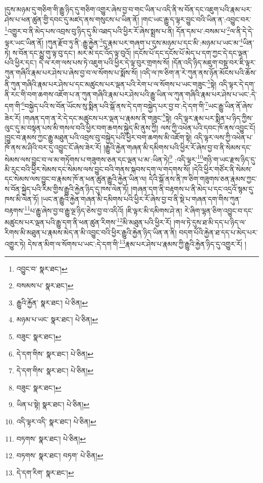 །དུས་མཉམ་དུ་གཅིག་གི་རྒྱུ་ཉིད་དུ་གཅིག་འགྱུར་ཞེས་བྱ་བ་གང་ཡིན་པ་འདི་ནི་ས་བོན་དང་འཇུག་པའི་རྣམ་པར་ཤེས་པ་ཕན་ཚུན་གྱི་དབང་དུ་མཛད་ནས་གསུངས་པ་ཡིན་ནོ། །གང་ཡང་རྒྱུ་ད་ལྟར་བྱུང་བའི་ཡིན་ན་:འབྱུང་བར་\footnote{འབྱུང་བ་  སྣར་ཐང་། }འགྱུར་བ་ནི་མེད་པས་འབྲས་བུ་ཉིད་དུ་མི་འཐད་པའི་ཕྱིར་རོ་ཞེས་སྨྲས་པ་ནི། དོན་དམ་པ་:བསམ་པ་\footnote{བསམས་པ་  སྣར་ཐང་། }ལ་ནི་དེ་དེ་ལྟར་ཡང་ཡིན་ནོ། །ཀུན་རྫོབ་ཏུ་ནི་:རྒྱུ་རྐྱེན་\footnote{རྒྱུའི་རྐྱོན་  སྣར་ཐང་།  པེ་ཅིན། }དུ་རྣམ་པར་གཞག་པ་དུས་མཉམ་པ་དང་མི་:མཉམ་པ་ཡང་མ་\footnote{མཉམ་པ་ཡང་  སྣར་ཐང་།  པེ་ཅིན། }ཡིན་ཏེ། ས་བོན་དང་མྱུ་གུ་ལྟ་བུ་དང་། མར་མེ་དང་འོད་ལྟ་བུའོ། །དངོས་པོ་དང་དངོས་པོ་མེད་པ་དག་ཀྱང་དེ་དང་ལྡན་པའི་ཕྱིར་དང་། དེ་ལ་རག་ལས་པས་ཏེ་འཇུག་པའི་ཕྱིར་དེ་ལྟ་བུར་གྲགས་སོ། །དོན་འདི་ཉིད་མཇུག་བསྡུ་བར་ཇི་ལྟར་ཀུན་གཞིའི་རྣམ་པར་ཤེས་པ་ཞེས་བྱ་བ་ལ་སོགས་པ་སྨོས་སོ། །འདི་ལ་ཁ་ཅིག་ན་རེ་ཀུན་ནས་ཉོན་མོངས་པའི་ཆོས་ནི་ཀུན་གཞིའི་རྣམ་པར་ཤེས་པ་དང་མཚུངས་པར་ལྡན་པའི་རེག་པ་ལ་སོགས་པ་ཡང་གཟུང་\footnote{བཟུང་  སྣར་ཐང་། }སྟེ། འདི་ལྟར་དེ་དག་ནི་རང་གི་བག་ཆགས་འཇོག་པ་ན་ཀུན་གཞིའི་རྣམ་པར་ཤེས་པའི་རྒྱུ་ཡིན་ལ་ཀུན་གཞིའི་རྣམ་པར་ཤེས་པ་ཡང་:དེ་དག་གི་\footnote{དེ་དག་གིས་  སྣར་ཐང་།  པེ་ཅིན། }བསྐྱེད་པའི་ས་བོན་ཡོངས་སུ་སྨིན་པའི་སྒོ་ནས་དེ་དག་བསྐྱེད་པར་བྱ་བ་:དེ་དག་གི་\footnote{དེ་དག་གིས་  སྣར་ཐང་།  པེ་ཅིན། }ཡང་རྒྱུ་ཡིན་ནོ་ཞེས་ཟེར་རོ། །གཞན་དག་ན་རེ་དེ་དང་མཚུངས་པར་ལྡན་པ་རྣམས་ནི་གཟུང་\footnote{བཟུང་  སྣར་ཐང་། }སྟེ། འདི་ལྟར་རྣམ་པར་སྨིན་པ་ཉིད་ཀྱིས་ལུང་དུ་མ་བསྟན་པས་མི་གསལ་བའི་ཕྱིར་བག་ཆགས་སྐྱེད་མི་ནུས་ཀྱི། ལས་ཀྱི་འཕེན་པའི་དབང་ཁོ་ནས་འབྱུང་ངོ། །བྱུང་བ་རྣམས་ཀྱང་རྒྱུ་མཐུན་པའི་འབྲས་བུ་བསྐྱེད་པའི་ཕྱིར་བག་ཆགས་མི་འཇོག་སྟེ། འདི་ལྟར་ལས་ཀྱི་འཕེན་པ་ཁོ་ནས་མ་ཤིའི་བར་དུ་འབྱུང་ངོ་ཞེས་ཟེར་རོ། །རྒྱུའི་རྐྱེན་གཞན་མི་དམིགས་པའི་ཕྱིར་རོ་ཞེས་བྱ་བ་ནི་སེམས་དང་སེམས་ལས་བྱུང་བ་ལ་མ་གཏོགས་པ་གཟུགས་ཅན་དང་ལྡན་པ་མ་:ཡིན་ཏེ།\footnote{ཡིན་པ་སྟེ།  སྣར་ཐང་།  པེ་ཅིན། } :འདི་ལྟར་\footnote{འདི་ལྟར་འདི་  སྣར་ཐང་།  པེ་ཅིན། }གཉི་ག་ཡང་རྫས་ཉིད་དུ་མི་རུང་བའི་ཕྱིར་སེམས་དང་སེམས་ལས་བྱུང་བའི་གནས་སྐབས་དག་ལ་གདགས་སོ། །དེའི་ཕྱིར་གཙོར་ནི་སེམས་དང་སེམས་ལས་བྱུང་བ་རྣམས་ཁོ་ན་ཕན་ཚུན་རྒྱུའི་རྐྱེན་ཡིན་ལ། དེའི་སྒོ་ནས་ནི་ཁ་ཅིག་གཟུགས་ཅན་རྣམས་ཀྱང་ས་བོན་སྐྱེད་པའི་རིམ་གྱིས་རྒྱུའི་རྐྱེན་ཉིད་དུ་ཁས་ལེན་ཏོ། །གཞན་དག་ནི་བརྟགས་པ་ནི་མེད་པ་དང་འདྲའོ་སྙམ་དུ་ཁས་མི་ལེན་ཏོ། །ཡང་ན་རྒྱུའི་རྐྱེན་གཞན་མི་དམིགས་པའི་ཕྱིར་རོ་ཞེས་བྱ་བ་ནི་སྡེ་པ་གཞན་དག་གིས་ཀུན་བརྟགས་\footnote{བཏགས་  སྣར་ཐང་།  པེ་ཅིན། }པ་རྒྱུ་ཞེས་བྱ་བ་རྒྱུ་ལྔ་ཉིད་ཅེས་བྱ་བ་འདིའོ། །ཇི་ལྟར་མི་དམིགས་ཤེ་ན། རེ་ཞིག་ལྷན་ཅིག་འབྱུང་བ་དང་མཚུངས་པར་ལྡན་པའི་རྒྱུ་དག་ནི་ཕན་ཚུན་རིགས་\footnote{བཏགས་  སྣར་ཐང་། བཏག་  པེ་ཅིན། }མི་མཐུན་པའི་ཕྱིར་རོ། །གལ་ཏེ་དུས་ཐ་མི་དད་པ་ཉིད་ལ་རིགས་མི་མཐུན་པ་རྣམས་མེད་ན་མི་འབྱུང་བའི་ཕྱིར་རྒྱུའི་རྐྱེན་ཉིད་ཡིན་ན་ནི། བདག་པོའི་རྐྱེན་ཐ་དད་པ་མེད་པར་འགྱུར་ཏེ། དེས་ན་མིག་ལ་སོགས་པ་ཡང་:དེ་དག་གི་\footnote{དེ་དག་རིག་  སྣར་ཐང་། }རྣམ་པར་ཤེས་པ་རྣམས་ཀྱི་རྒྱུའི་རྐྱེན་ཉིད་དུ་འགྱུར་རོ། །

